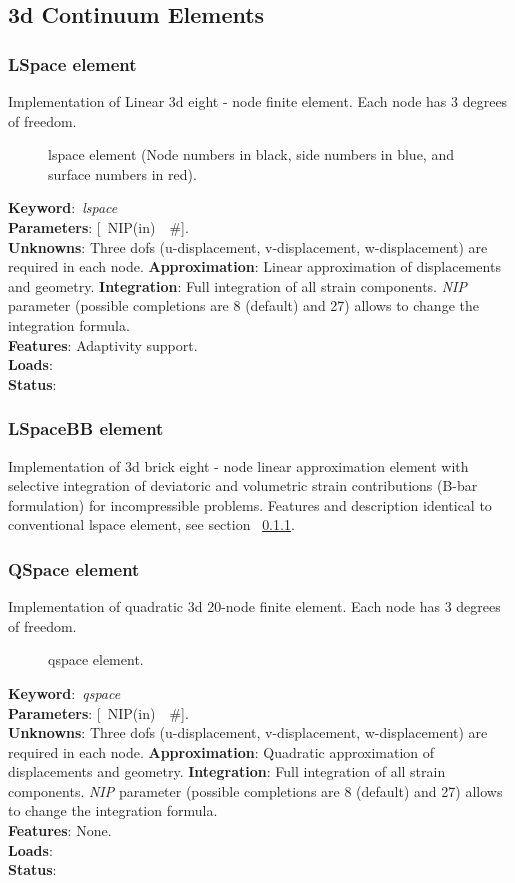 \documentclass[12pt,dvips]{article}
\newcommand{\descitem}[1]{{\noindent \bf #1}:}
\newcommand{\elemkeyword}[1]{\descitem{Keyword}~{\em #1}}
\newcommand{\elemparam}[2]{{{#1\tiny (#2)}~~\#}}
\newcommand{\optelemparam}[2]{{[~\elemparam{#1}{#2}]}}
\newcommand{\param}[1]{{\it #1}}
\begin{document}
\subsection{3d Continuum Elements}
\subsubsection{LSpace element}
\label{lspacesect}
Implementation of Linear 3d  eight - node 
finite element. Each node has 3 degrees of freedom.
\begin{figure}[tb]
\centerline{}
\caption{lspace element (Node numbers in black, side numbers in blue,
and surface numbers in red).}
\end{figure}

\elemkeyword{lspace}\\
\descitem{Parameters} \optelemparam{NIP}{in}. \\
\descitem{Unknowns}
Three dofs (u-displacement, v-displacement, w-displacement) are required in each node.
\descitem{Approximation} Linear approximation of displacements and
geometry.
\descitem{Integration}
Full integration of all strain components.
\param{NIP} parameter (possible completions are 8 (default) and 27)
allows to change the integration formula.\\
\descitem{Features} Adaptivity support.\\
\descitem{Loads} \\
\descitem{Status} 

\subsubsection{LSpaceBB element}
Implementation of 3d brick  eight - node 
linear approximation element with selective integration of deviatoric and volumetric strain contributions (B-bar formulation) for incompressible problems. Features and description identical to conventional lspace element, see section ~\ref{lspacesect}.

\subsubsection{QSpace element}
Implementation of quadratic 3d  20-node 
finite element. Each node has 3 degrees of freedom.
\begin{figure}[tb]
\centerline{}
\caption{qspace element.}
\end{figure}

\elemkeyword{qspace}\\
\descitem{Parameters} \optelemparam{NIP}{in}. \\
\descitem{Unknowns}
Three dofs (u-displacement, v-displacement, w-displacement) are required in each node.
\descitem{Approximation} Quadratic approximation of displacements and
geometry.
\descitem{Integration}
Full integration of all strain components.
\param{NIP} parameter (possible completions are 8 (default) and 27)
allows to change the integration formula.\\
\descitem{Features} None.\\
\descitem{Loads} \\
\descitem{Status} 
\end{document}
